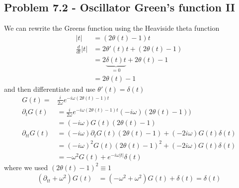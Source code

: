 \documentclass[10pt,a4paper]{book}
\theoremstyle{definition}
\begin{document}
\subsection{Problem 7.2 - Oscillator Green's function II}
We can rewrite the Greens function using the Heaviside theta function 
\begin{align}
|t|
&=(2\theta(t)-1)t\\
\frac{d}{dt}|t|
&=2\theta'(t)t+(2\theta(t)-1)\\
&=2\underbrace{\delta(t)t}_{=0}+2\theta(t)-1\\
&=2\theta(t)-1
\end{align}
and then differentiate and use $\theta'(t)=\delta(t)$
\begin{align}
G(t)=&\frac{i}{2\omega}e^{-i\omega(2\theta(t)-1)t}\\
\partial_t G(t)
&=\frac{i}{2\omega}e^{-i\omega(2\theta(t)-1)t}(-i\omega)(2\theta(t)-1))\\
&=(-i\omega)G(t)\left(2\theta(t)-1\right)\\
\partial_{tt} G(t)
&=(-i\omega)\partial_tG(t)\left(2\theta(t)-1\right)+(-2i\omega)G(t)\delta(t)\\
&=(-i\omega)^2G(t)\left(2\theta(t)-1\right)^2+(-2i\omega)G(t)\delta(t)\\
&=-\omega^2G(t)+e^{-i\omega|t|}\delta(t)
\end{align}
where we used $\left(2\theta(t)-1\right)^2\equiv1$
\begin{align}
\left(\partial_{tt}+\omega^2\right)G(t)
&=\left(-\omega^2+\omega^2\right)G(t)+\delta(t)=\delta(t)
\end{align}
\end{document}
